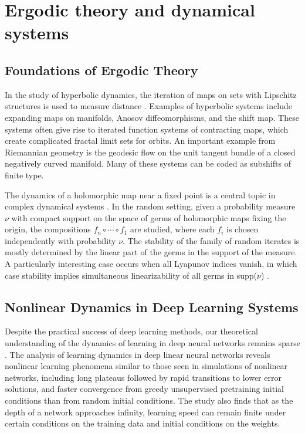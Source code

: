 \documentclass{article}
\begin{document}
\section{Ergodic theory and dynamical systems}

\subsection{Foundations of Ergodic Theory}

In the study of hyperbolic dynamics, the iteration of maps on sets with Lipschitz structures is used to measure distance \cite{Mirzakhani2010IntroductionTE}. Examples of hyperbolic systems include expanding maps on manifolds, Anosov diffeomorphisms, and the shift map. These systems often give rise to iterated function systems of contracting maps, which create complicated fractal limit sets for orbits. An important example from Riemannian geometry is the geodesic flow on the unit tangent bundle of a closed negatively curved manifold. Many of these systems can be coded as subshifts of finite type.

The dynamics of a holomorphic map near a fixed point is a central topic in complex dynamical systems \cite{Guerini2018ErgodicTA}. In the random setting, given a probability measure $\nu$ with compact support on the space of germs of holomorphic maps fixing the origin, the compositions $f_n \circ \cdots \circ f_1$ are studied, where each $f_i$ is chosen independently with probability $\nu$. The stability of the family of random iterates is mostly determined by the linear part of the germs in the support of the measure. A particularly interesting case occurs when all Lyapunov indices vanish, in which case stability implies simultaneous linearizability of all germs in supp($\nu$) \cite{Guerini2018ErgodicTA}.

\subsection{Nonlinear Dynamics in Deep Learning Systems}

Despite the practical success of deep learning methods, our theoretical understanding of the dynamics of learning in deep neural networks remains sparse \cite{Saxe2013ExactST}. The analysis of learning dynamics in deep linear neural networks reveals nonlinear learning phenomena similar to those seen in simulations of nonlinear networks, including long plateaus followed by rapid transitions to lower error solutions, and faster convergence from greedy unsupervised pretraining initial conditions than from random initial conditions. The study also finds that as the depth of a network approaches infinity, learning speed can remain finite under certain conditions on the training data and initial conditions on the weights.
\end{document}
